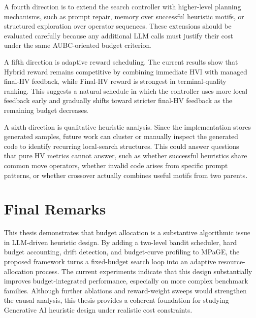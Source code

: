 A fourth direction is to extend the search controller with higher-level planning mechanisms, such as prompt repair, memory over successful heuristic motifs, or structured exploration over operator sequences. These extensions should be evaluated carefully because any additional LLM calls must justify their cost under the same AUBC-oriented budget criterion.

A fifth direction is adaptive reward scheduling. The current results show that Hybrid reward remains competitive by combining immediate HVI with managed final-HV feedback, while Final-HV reward is strongest in terminal-quality ranking. This suggests a natural schedule in which the controller uses more local feedback early and gradually shifts toward stricter final-HV feedback as the remaining budget decreases.

A sixth direction is qualitative heuristic analysis. Since the implementation stores generated samples, future work can cluster or manually inspect the generated code to identify recurring local-search structures. This could answer questions that pure HV metrics cannot answer, such as whether successful heuristics share common move operators, whether invalid code arises from specific prompt patterns, or whether crossover actually combines useful motifs from two parents.

\section{Final Remarks}

This thesis demonstrates that budget allocation is a substantive algorithmic issue in LLM-driven heuristic design. By adding a two-level bandit scheduler, hard budget accounting, drift detection, and budget-curve profiling to MPaGE, the proposed framework turns a fixed-budget search loop into an adaptive resource-allocation process. The current experiments indicate that this design substantially improves budget-integrated performance, especially on more complex benchmark families. Although further ablations and reward-weight sweeps would strengthen the causal analysis, this thesis provides a coherent foundation for studying Generative AI heuristic design under realistic cost constraints.
